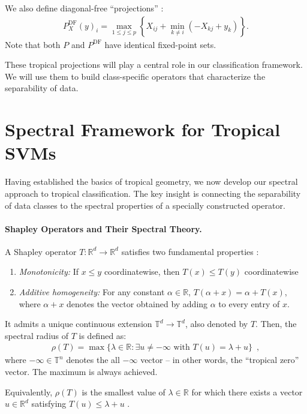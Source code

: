 \documentclass{article}
\newcommand{\R}{\mathbb{R}}
\newcommand{\T}{\mathbb{T}}
\begin{document}
We also define diagonal-free ``projections'' \cite{gaubert2011}:
 \begin{align}
 P_X^{\text{DF}}(y)_i = \max_{1 \leq j \leq p} \left\{X_{ij} + \min_{k \neq i} (-X_{kj} + y_k)\right\}.
 \end{align}
 Note that both $P$ and $P^\text{DF}$ have identical fixed-point sets.

These tropical projections will play a central role in our classification framework. We will use them to build class-specific operators that characterize the separability of data.

\section{Spectral Framework for Tropical SVMs}\label{sec:spectral}

Having established the basics of tropical geometry, we now develop our spectral approach to tropical classification. The key insight is connecting the separability of data classes to the spectral properties of a specially constructed operator.

\paragraph{Shapley Operators and Their Spectral Theory.}
A Shapley operator $T: \R^d \to \R^d$ satisfies two fundamental properties \cite{kolokoltsov1992}:
\begin{enumerate}
    \item \textit{Monotonicity:} If $x \leq y$ coordinatewise, then $T(x) \leq T(y)$ coordinatewise
    \item \textit{Additive homogeneity:} For any constant $\alpha \in \R$, $T(\alpha + x) = \alpha + T(x)$,
      where $\alpha +x$ denotes the vector obtained by adding $\alpha$ to every entry of $x$.
\end{enumerate}
It admits a unique continuous extension $\T^d\to \T^d$, also denoted by $T$. Then, the spectral radius of $T$ is defined as:
\begin{align}
\rho(T) = \max\{\lambda \in \R : \exists u \neq -\infty \text{ with } T(u) = \lambda + u\} \enspace,
\end{align}
where $-\infty\in \T^n$ denotes the all $-\infty$ vector -- in other words, the ``tropical zero'' vector.
The maximum is always achieved.

Equivalently, $\rho(T)$ is the smallest value of $\lambda\in \R$ for which there exists a vector $u\in\R^d$
satisfying $T(u) \leq \lambda + u$ \cite{nussbaum1986,AGGut10,akiangaubertqisaadi}.
\end{document}
